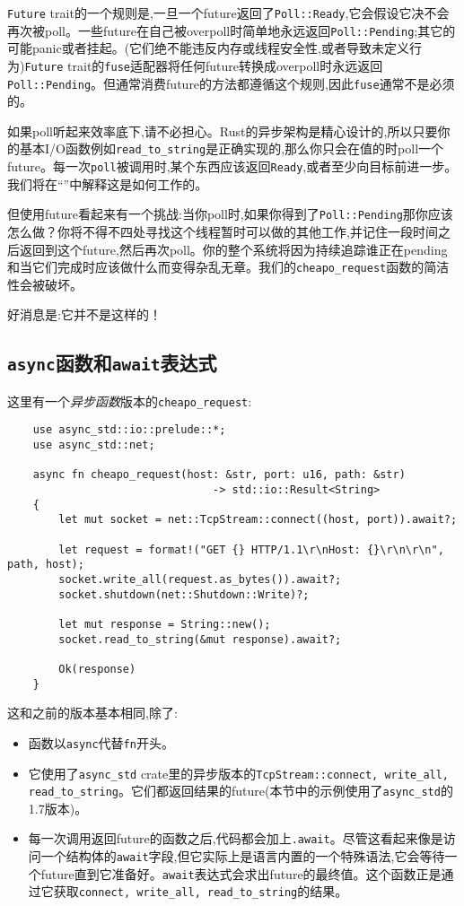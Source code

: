 \texttt{Future} trait的一个规则是,一旦一个future返回了\texttt{Poll::Ready},它会假设它决不会再次被poll。一些future在自己被overpoll时简单地永远返回\texttt{Poll::Pending};其它的可能panic或者挂起。(它们绝不能违反内存或线程安全性,或者导致未定义行为)\texttt{Future} trait的\texttt{fuse}适配器将任何future转换成overpoll时永远返回\texttt{Poll::Pending}。但通常消费future的方法都遵循这个规则,因此\texttt{fuse}通常不是必须的。

如果poll听起来效率底下,请不必担心。Rust的异步架构是精心设计的,所以只要你的基本I/O函数例如\texttt{read\_to\_string}是正确实现的,那么你只会在值的时poll一个future。每一次\texttt{poll}被调用时,某个东西应该返回\texttt{Ready},或者至少向目标前进一步。我们将在“”中解释这是如何工作的。

但使用future看起来有一个挑战:当你poll时,如果你得到了\texttt{Poll::Pending}那你应该怎么做？你将不得不四处寻找这个线程暂时可以做的其他工作,并记住一段时间之后返回到这个future,然后再次poll。你的整个系统将因为持续追踪谁正在pending和当它们完成时应该做什么而变得杂乱无章。我们的\texttt{cheapo\_request}函数的简洁性会被破坏。

好消息是:它并不是这样的！

\subsection{\texttt{async}函数和\texttt{await}表达式}
这里有一个\emph{异步函数}版本的\texttt{cheapo\_request}:
\begin{verbatim}
    use async_std::io::prelude::*;
    use async_std::net;

    async fn cheapo_request(host: &str, port: u16, path: &str)
                                -> std::io::Result<String>
    {
        let mut socket = net::TcpStream::connect((host, port)).await?;

        let request = format!("GET {} HTTP/1.1\r\nHost: {}\r\n\r\n", path, host);
        socket.write_all(request.as_bytes()).await?;
        socket.shutdown(net::Shutdown::Write)?;

        let mut response = String::new();
        socket.read_to_string(&mut response).await?;

        Ok(response)
    }
\end{verbatim}

这和之前的版本基本相同,除了:
\begin{itemize}
    \item 函数以\texttt{async}代替\texttt{fn}开头。
    \item 它使用了\texttt{async\_std} crate里的异步版本的\texttt{TcpStream::connect, write\_all, read\_to\_string}。它们都返回结果的future(本节中的示例使用了\texttt{async\_std}的1.7版本)。
    \item 每一次调用返回future的函数之后,代码都会加上\texttt{.await}。尽管这看起来像是访问一个结构体的\texttt{await}字段,但它实际上是语言内置的一个特殊语法,它会等待一个future直到它准备好。\texttt{await}表达式会求出future的最终值。这个函数正是通过它获取\texttt{connect, write\_all, read\_to\_string}的结果。
\end{itemize}

